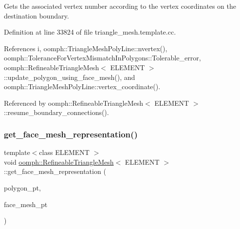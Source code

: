 Gets the associated vertex number according to the vertex coordinates on the destination boundary. 

Definition at line 33824 of file triangle\+\_\+mesh.\+template.\+cc.



References i, oomph\+::\+Triangle\+Mesh\+Poly\+Line\+::nvertex(), oomph\+::\+Tolerance\+For\+Vertex\+Mismatch\+In\+Polygons\+::\+Tolerable\+\_\+error, oomph\+::\+Refineable\+Triangle\+Mesh$<$ E\+L\+E\+M\+E\+N\+T $>$\+::update\+\_\+polygon\+\_\+using\+\_\+face\+\_\+mesh(), and oomph\+::\+Triangle\+Mesh\+Poly\+Line\+::vertex\+\_\+coordinate().



Referenced by oomph\+::\+Refineable\+Triangle\+Mesh$<$ E\+L\+E\+M\+E\+N\+T $>$\+::resume\+\_\+boundary\+\_\+connections().

\mbox{\label{classoomph_1_1RefineableTriangleMesh_a5ebb485316134f608bc89ab9854eac6c}} 
\subsubsection{\texorpdfstring{get\+\_\+face\+\_\+mesh\+\_\+representation()}{get\_face\_mesh\_representation()}\hspace{0.1cm}{\footnotesize\ttfamily [1/2]}}
{\footnotesize\ttfamily template$<$class E\+L\+E\+M\+E\+NT $>$ \\
void \hyperlink{classoomph_1_1RefineableTriangleMesh}{oomph\+::\+Refineable\+Triangle\+Mesh}$<$ E\+L\+E\+M\+E\+NT $>$\+::get\+\_\+face\+\_\+mesh\+\_\+representation (\begin{DoxyParamCaption}\item[{\hyperlink{classoomph_1_1TriangleMeshPolygon}{Triangle\+Mesh\+Polygon} $\ast$}]{polygon\+\_\+pt,  }\item[{\hyperlink{classoomph_1_1Vector}{Vector}$<$ \hyperlink{classoomph_1_1Mesh}{Mesh} $\ast$$>$ \&}]{face\+\_\+mesh\+\_\+pt }\end{DoxyParamCaption})\hspace{0.3cm}{\ttfamily [protected]}}



